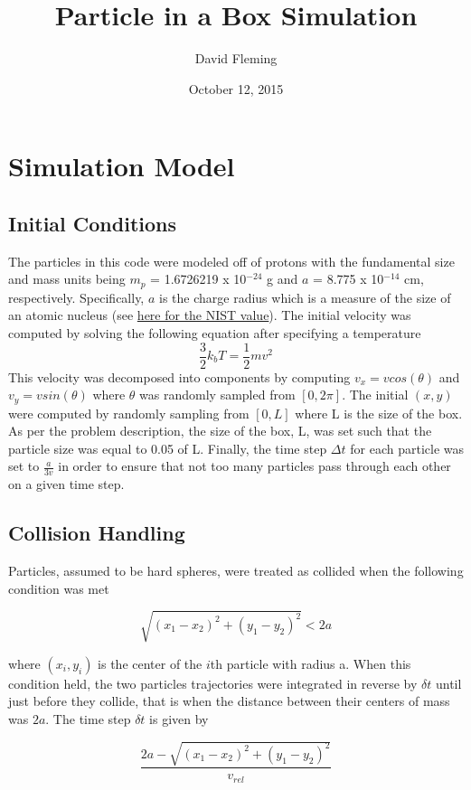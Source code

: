 \documentclass[12pt]{amsart}
\title{Particle in a Box Simulation}
\author{David Fleming}
\date{October 12, 2015} %
\begin{document}
\maketitle


\section{Simulation Model}
\subsection{Initial Conditions}

The particles in this code were modeled off of protons with the fundamental size and mass units being $m_p$ = 1.6726219 x 10$^{-24}$ g and $a$ = 8.775 x 10$^{-14}$ cm, respectively.  Specifically, $a$ is the charge radius which is a measure of the size of an atomic nucleus (see \href{http://physics.nist.gov/cgi-bin/cuu/Value?rp}{here for the NIST value}).  The initial velocity was computed by solving the following equation after specifying a temperature $$ \frac{3}{2} k_b T = \frac{1}{2} m v^2 $$  This velocity was decomposed into components by computing $v_x = vcos(\theta)$ and $v_y = vsin(\theta)$ where $\theta$ was randomly sampled from $[0,2 \pi]$. The initial $(x,y)$  were computed by randomly sampling from $[0,L]$ where L is the size of the box.  As per the problem description, the size of the box, L, was set such that the particle size was equal to 0.05 of L.  Finally, the time step $\Delta t$ for each particle was set to $\frac{a}{3v}$ in order to ensure that not too many particles pass through each other on a given time step.

\subsection{Collision Handling}

Particles, assumed to be hard spheres, were treated as collided when the following condition was met

$$ \sqrt{(x_1 - x_2)^2 + (y_1 - y_2)^2} < 2a  $$ 

where $(x_i,y_i)$ is the center of the $i$th particle with radius a.  When this condition held, the two particles trajectories were integrated in reverse by $\delta t$ until just before they collide, that is when the distance between their centers of mass was $2a$.  The time step $\delta t$ is given by 

$$\frac{2a - \sqrt{(x_1 - x_2)^2 + (y_1 - y_2)^2}}{v_{rel}}  $$ 
\end{document}
